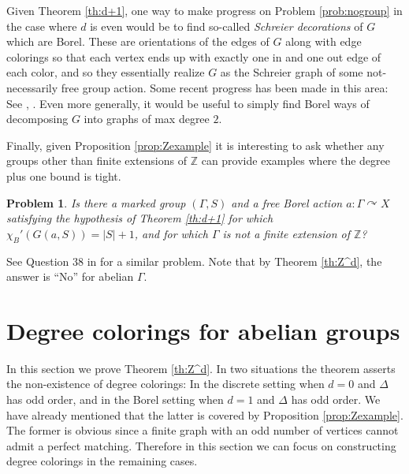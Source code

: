 \documentclass[10pt,a4paper]{article}
\newcommand{\0}{\varnothing}
\newcommand{\Z}{\mathbb{Z}}
\newtheorem{prob}{Problem}
\begin{document}
Given Theorem \ref{th:d+1}, one way to make progress on Problem \ref{prob:nogroup} in the case where $d$ is even would be to find  so-called \textit{Schreier decorations} of $G$ which are Borel. These are orientations of the edges of $G$ along with edge colorings so that each vertex ends up with exactly one in and one out edge of each color, and so they essentially realize $G$ as the Schreier graph of some not-necessarily free group action. Some recent progress has been made in this area: See \cite{T21}, \cite{BHT}. Even more generally, it would be useful to simply find Borel ways of decomposing $G$ into graphs of max degree $2$.

Finally, given Proposition \ref{prop:Zexample} it is interesting to ask whether any groups other than finite extensions of $\Z$ can provide examples where the degree plus one bound is tight. 

\begin{prob}
Is there a marked group $(\Gamma,S)$ and a free Borel action $a:\Gamma \curvearrowright X$ satisfying the hypothesis of Theorem \ref{th:d+1} for which $\chi_B'(G(a,S)) = |S|+1$, and for which $\Gamma$ is not a finite extension of $\Z$? 
\end{prob}

See Question 38 in \cite{BHT} for a similar problem. Note that by Theorem \ref{th:Z^d}, the answer is ``No'' for abelian $\Gamma$.


\section{Degree colorings for abelian groups}\label{sec:Z^d}


In this section we prove Theorem \ref{th:Z^d}. In two situations the theorem asserts the non-existence of degree colorings: In the discrete setting when $d = 0$ and $\Delta$ has odd order, and in the Borel setting when $d = 1$ and $\Delta$ has odd order. We have already mentioned that the latter is covered by Proposition \ref{prop:Zexample}. The former is obvious since a finite graph with an odd number of vertices cannot admit a perfect matching. Therefore in this section we can focus on constructing degree colorings in the remaining cases.
\end{document}
